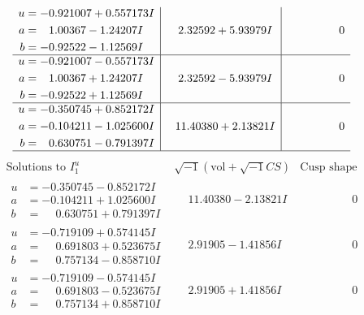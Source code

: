 \documentclass[1p]{elsarticle_modified}
\theoremstyle{definition}
\newcommand{\I}{\sqrt{-1}}
\begin{document}
$$\begin{array}{c|c|c}
\begin{aligned}
u &= -0.921007 + 0.557173 I \\
a &= \phantom{-}1.00367 - 1.24207 I \\
b &= -0.92522 - 1.12569 I\end{aligned}
 & \phantom{-}2.32592 + 5.93979 I & \phantom{-0.000000 } 0 \\ \hline\begin{aligned}
u &= -0.921007 - 0.557173 I \\
a &= \phantom{-}1.00367 + 1.24207 I \\
b &= -0.92522 + 1.12569 I\end{aligned}
 & \phantom{-}2.32592 - 5.93979 I & \phantom{-0.000000 } 0 \\ \hline\begin{aligned}
u &= -0.350745 + 0.852172 I \\
a &= -0.104211 - 1.025600 I \\
b &= \phantom{-}0.630751 - 0.791397 I\end{aligned}
 & \phantom{-}11.40380 + 2.13821 I & \phantom{-0.000000 } 0\\
 \hline 
 \end{array}$$\newpage$$\begin{array}{c|c|c}  
\text{Solutions to }I^u_{1}& \I (\text{vol} + \sqrt{-1}CS) & \text{Cusp shape}\\
 \hline 
\begin{aligned}
u &= -0.350745 - 0.852172 I \\
a &= -0.104211 + 1.025600 I \\
b &= \phantom{-}0.630751 + 0.791397 I\end{aligned}
 & \phantom{-}11.40380 - 2.13821 I & \phantom{-0.000000 } 0 \\ \hline\begin{aligned}
u &= -0.719109 + 0.574145 I \\
a &= \phantom{-}0.691803 + 0.523675 I \\
b &= \phantom{-}0.757134 - 0.858710 I\end{aligned}
 & \phantom{-}2.91905 - 1.41856 I & \phantom{-0.000000 } 0 \\ \hline\begin{aligned}
u &= -0.719109 - 0.574145 I \\
a &= \phantom{-}0.691803 - 0.523675 I \\
b &= \phantom{-}0.757134 + 0.858710 I\end{aligned}
 & \phantom{-}2.91905 + 1.41856 I & \phantom{-0.000000 } 0 \\ \hline\begin{aligned}

\end{aligned}
\end{array}$$
\end{document}

